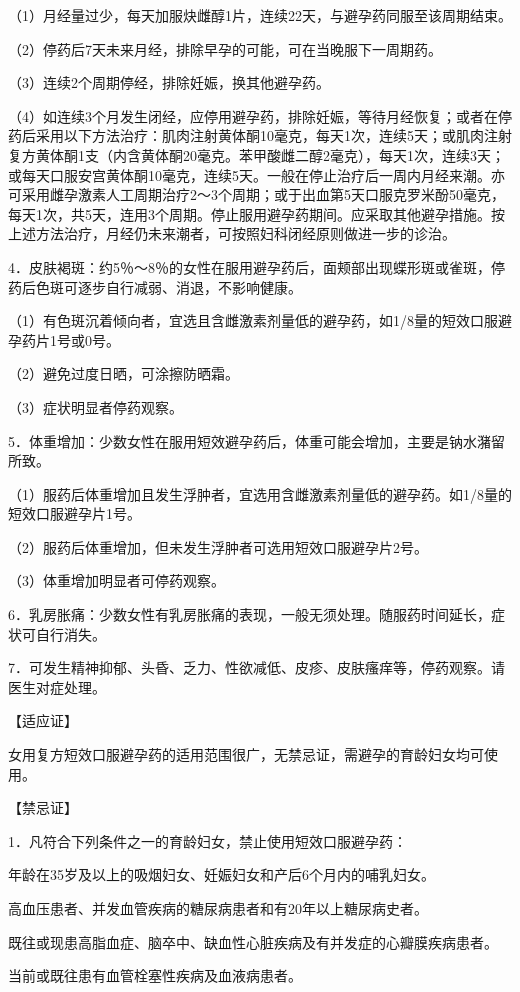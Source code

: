 \documentclass[12pt,UTF8]{ctexbook}
\begin{document}
（1）月经量过少，每天加服炔雌醇1片，连续22天，与避孕药同服至该周期结束。

（2）停药后7天未来月经，排除早孕的可能，可在当晚服下一周期药。

（3）连续2个周期停经，排除妊娠，换其他避孕药。

（4）如连续3个月发生闭经，应停用避孕药，排除妊娠，等待月经恢复；或者在停药后采用以下方法治疗：肌肉注射黄体酮10毫克，每天1次，连续5天；或肌肉注射复方黄体酮1支（内含黄体酮20毫克。苯甲酸雌二醇2毫克），每天1次，连续3天；或每天口服安宫黄体酮10毫克，连续5天。一般在停止治疗后一周内月经来潮。亦可采用雌孕激素人工周期治疗2～3个周期；或于出血第5天口服克罗米酚50毫克，每天1次，共5天，连用3个周期。停止服用避孕药期间。应采取其他避孕措施。按上述方法治疗，月经仍未来潮者，可按照妇科闭经原则做进一步的诊治。

4．皮肤褐斑：约5％～8％的女性在服用避孕药后，面颊部出现蝶形斑或雀斑，停药后色斑可逐步自行减弱、消退，不影响健康。

（1）有色斑沉着倾向者，宜选且含雌激素剂量低的避孕药，如1/8量的短效口服避孕药片1号或0号。

（2）避免过度日晒，可涂擦防晒霜。

（3）症状明显者停药观察。

5．体重增加：少数女性在服用短效避孕药后，体重可能会增加，主要是钠水潴留所致。

（1）服药后体重增加且发生浮肿者，宜选用含雌激素剂量低的避孕药。如1/8量的短效口服避孕片1号。

（2）服药后体重增加，但未发生浮肿者可选用短效口服避孕片2号。

（3）体重增加明显者可停药观察。

6．乳房胀痛：少数女性有乳房胀痛的表现，一般无须处理。随服药时间延长，症状可自行消失。

7．可发生精神抑郁、头昏、乏力、性欲减低、皮疹、皮肤瘙痒等，停药观察。请医生对症处理。

【适应证】

女用复方短效口服避孕药的适用范围很广，无禁忌证，需避孕的育龄妇女均可使用。

【禁忌证】

1．凡符合下列条件之一的育龄妇女，禁止使用短效口服避孕药：

年龄在35岁及以上的吸烟妇女、妊娠妇女和产后6个月内的哺乳妇女。

高血压患者、并发血管疾病的糖尿病患者和有20年以上糖尿病史者。

既往或现患高脂血症、脑卒中、缺血性心脏疾病及有并发症的心瓣膜疾病患者。

当前或既往患有血管栓塞性疾病及血液病患者。
\end{document}
